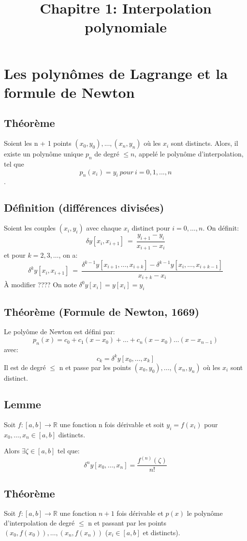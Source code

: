 \documentclass{article}
\title{Chapitre 1: Interpolation polynomiale}
\newcommand{\R}{\mathbb{R}}
\begin{document}
\maketitle

\section{Les polynômes de Lagrange et la formule de Newton}
\subsection{Théorème}
Soient les n + 1 points $(x_0, y_0), . . . , (x_n , y_n )$ où les $x_i$ sont distincts. Alors, il
existe un polynôme unique $p_n$ de degré $\leq n$, appelé le polynôme d’interpolation, tel que
$$p_n (x_i ) = y_i\ pour\ i = 0, 1, . . . , n$$.

\subsection{Définition (différences divisées)}
Soient les couples $(x_i, y_i)$ avec chaque $x_i$ distinct pour $i = 0, \dots, n$. On définit:
$$\delta y[x_i, x_{i+1}]\ = \ \frac{y_{i + 1} - y_i}{x_{i+1} - x_i}$$
et pour $k = 2, 3, \dots$, on a:
$$\delta^k y[x_i, x_{i + 1}]\ = \ \frac{\delta^{k - 1} y[x_{i + 1}, \dots, x_{i + k}]- \delta^{k-1} y[x_i, \dots, x_{i + k - 1}]}{x_{i + k} - x_i}$$
À modifier ????
On note $\delta^0 y[x_i] = y[x_i] = y_i$
\subsection{Théorème (Formule de Newton, 1669)}
Le polyôme de Newton est défini par:
$$p_n(x) = c_0 + c_1(x-x_0) + \dots + c_n(x - x_0)\dots (x-x_{n - 1})$$
avec:
$$c_k = \delta^k y[x_0, \dots, x_k]$$
Il est de degré $\leq$ n et passe par les points $(x_0, y_0), \dots, (x_n, y_n)$ où les $x_i$ sont distinct.

\subsection{Lemme}
Soit $f: [a, b] \rightarrow \R$ une fonction n fois dérivable et soit $y_i = f(x_i)$ pour $x_0, \dots, x_n \in [a, b]$ distincts.

Alors $\exists \zeta \in [a, b]$ tel que:
$$\delta^n y[x_0, \dots, x_n] = \frac{f^{(n)}(\zeta)}{n!}$$

\subsection{Théorème}
Soit $f: [a, b] \rightarrow \R$ une fonction $n+1$ fois dérivable et $p(x)$ le polynôme d'interpolation de degré $\leq$ n et passant par les points $(x_0, f(x_0)), \dots, (x_n, f(x_n))$
($x_i \in [a, b]$ et distincts).
\end{document}
